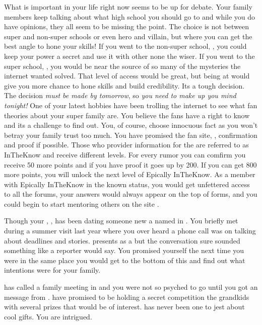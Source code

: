 \documentclass[char]{LRSguildcamp1}
\begin{document}
What is important in your life right now seems to be up for debate. Your family members keep talking about what high school you should go to and while you do have opinions, they all seem to be missing the point. The choice is not between super and non-super schools or even hero and villain, but where you can get the best angle to hone your skills! If you went to the non-super school, \pNormalSchool{}, you could keep your power a secret and use it with other none the wiser. If you went to the super school, \pSuperSchool{}, you would be near the source of so many of the mysteries the internet wanted solved. That level of access would be great, but being at \pNormalSchool{} would give you more chance to hone skills and build credibility. Its a tough decision. The decision \textsl{must be made by tomorrow}, so \textit{you need to make up you mind tonight!}
One of your latest hobbies have been trolling the internet to see what fan theories about your super family are. You believe the fans have a right to know and its a challenge to find out. You, of course, choose innocuous fact as you won't betray your family trust too much. You have promised the fan site, \pTweenwebsite{}, confirmation and proof if possible. Those who provider information for the \pTweenwebsite{} are referred to as InTheKnow and receive different levels.  For every rumor you can comfirm you receive 50 more points and if you have proof it goes up by 200. If you can get 800 more points, you will unlock the next level of Epically InTheKnow. As a member with Epically InTheKnow in the known status, you would get unfettered access to all the forums, your answers would always appear on the top of forms, and you could begin to start mentoring others on the site \pTweenwebsite{}.

Though your \cYoungest{\uncle}, \cYoungest{}, has been dating someone new a \cAS{\hero} named \cAS{} in \pCityYoungest{}. You briefly met \cAS{} during a summer visit last year where you over heard a phone call \cAS{\they} was on talking about deadlines and stories. \cAS{} presents as a \cAS{\hero} but the conversation sure sounded something like a reporter would say. You promised yourself the next time you were in the same place you would get to the bottom of this and find out what \cAS{\their} intentions were for your family.

\cGrandma{} has called a family meeting in \pCityGrandma{} and you were not so psyched to go until you got an message from \cGrandma{}. \cGrandma{\they} have promised to be holding a secret competition the grandkids with several prizes that would be of interest. \cGrandma{} has never been one to jest about cool gifts. You are intrigued.  
\end{document}
